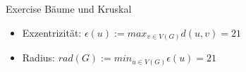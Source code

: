 \begin{frame}[allowframebreaks]{Exercise \thesection}{Bäume und Kruskal}
\begin{solutionnoinc}
{\begin{minipage}[t]{22cm}
          \end{minipage}
      }
    \end{solutionnoinc}
    \begin{solution}
      \begin{itemize}
        \item \alert{Exzentrizität:} $\epsilon(u) := max_{v\in V(G)} d(u,v) = 21$
        \item \alert{Radius:} $rad(G) := min_{u\in V(G)} \epsilon(u) = 21$
      \end{itemize}
    \end{solution}
\end{frame}

